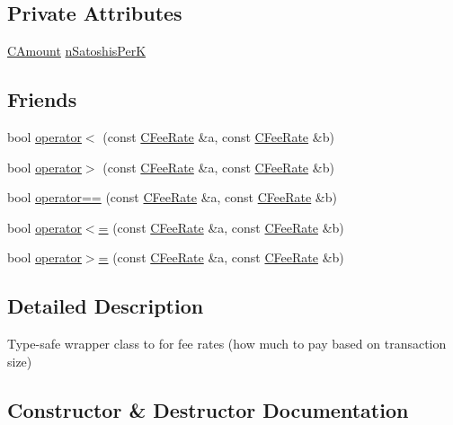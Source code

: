 \subsection*{Private Attributes}
\begin{DoxyCompactItemize}
\item 
\mbox{\hyperlink{amount_8h_a4eaf3a5239714d8c45b851527f7cb564}{C\+Amount}} \mbox{\hyperlink{class_c_fee_rate_a80e7dc7192bd5ef6ef9eede89d406ac1}{n\+Satoshis\+PerK}}
\end{DoxyCompactItemize}
\subsection*{Friends}
\begin{DoxyCompactItemize}
\item 
bool \mbox{\hyperlink{class_c_fee_rate_ac6171d01f1032c0f08e804f2b19e84e8}{operator$<$}} (const \mbox{\hyperlink{class_c_fee_rate}{C\+Fee\+Rate}} \&a, const \mbox{\hyperlink{class_c_fee_rate}{C\+Fee\+Rate}} \&b)
\item 
bool \mbox{\hyperlink{class_c_fee_rate_ab69eafe1cbb126cc0549bc5936422a2c}{operator$>$}} (const \mbox{\hyperlink{class_c_fee_rate}{C\+Fee\+Rate}} \&a, const \mbox{\hyperlink{class_c_fee_rate}{C\+Fee\+Rate}} \&b)
\item 
bool \mbox{\hyperlink{class_c_fee_rate_a90b4daf7a7d840f47c453b9ba51744cf}{operator==}} (const \mbox{\hyperlink{class_c_fee_rate}{C\+Fee\+Rate}} \&a, const \mbox{\hyperlink{class_c_fee_rate}{C\+Fee\+Rate}} \&b)
\item 
bool \mbox{\hyperlink{class_c_fee_rate_af580c9e0a2509b79a497cee50116bfcc}{operator$<$=}} (const \mbox{\hyperlink{class_c_fee_rate}{C\+Fee\+Rate}} \&a, const \mbox{\hyperlink{class_c_fee_rate}{C\+Fee\+Rate}} \&b)
\item 
bool \mbox{\hyperlink{class_c_fee_rate_a3eebd7ed699091974194e47cfb2a571c}{operator$>$=}} (const \mbox{\hyperlink{class_c_fee_rate}{C\+Fee\+Rate}} \&a, const \mbox{\hyperlink{class_c_fee_rate}{C\+Fee\+Rate}} \&b)
\end{DoxyCompactItemize}


\subsection{Detailed Description}
Type-\/safe wrapper class to for fee rates (how much to pay based on transaction size) 

\subsection{Constructor \& Destructor Documentation}
\mbox{\label{class_c_fee_rate_aed181aa12213c646c8a4632280444412}} 
